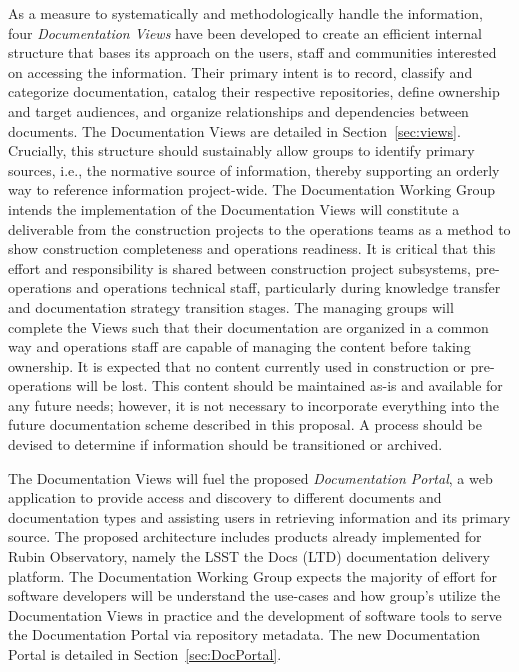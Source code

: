 As a measure to systematically and methodologically handle the information, four \emph{Documentation Views} have been developed to create an efficient internal structure that bases its approach on the users, staff and communities interested on accessing the information.
Their primary intent is to record, classify and categorize documentation, catalog their respective repositories, define ownership and target audiences, and organize relationships and dependencies between documents.
The Documentation Views are detailed in Section~\ref{sec:views}.
Crucially, this structure should sustainably allow groups to identify primary sources, i.e., the normative source of information, thereby supporting an orderly way to reference information project-wide.
The Documentation Working Group intends the implementation of the Documentation Views will constitute a deliverable from the construction projects to the operations teams as a method to show construction completeness and operations readiness.
It is critical that this effort and responsibility is shared between construction project subsystems, pre-operations and operations technical staff, particularly during knowledge transfer and documentation strategy transition stages.
The managing groups will complete the Views such that their documentation are organized in a common way and operations staff are capable of managing the content before taking ownership.
It is expected that no content currently used in construction or pre-operations will be lost.
This content should be maintained as-is and available for any future needs; however, it is not necessary to incorporate everything into the future documentation scheme described in this proposal.
A process should be devised to determine if information should be transitioned or archived.

The Documentation Views will fuel the proposed \emph{Documentation Portal}, a web application to provide access and discovery to different documents and documentation types and assisting users in retrieving information and its primary source.
The proposed architecture includes products already implemented for Rubin Observatory, namely the LSST the Docs (LTD) documentation delivery platform.
The Documentation Working Group expects the majority of effort for software developers will be understand the use-cases and how group's utilize the Documentation Views in practice and the development of software tools to serve the Documentation Portal via repository metadata.
The new Documentation Portal is detailed in Section~\ref{sec:DocPortal}.

